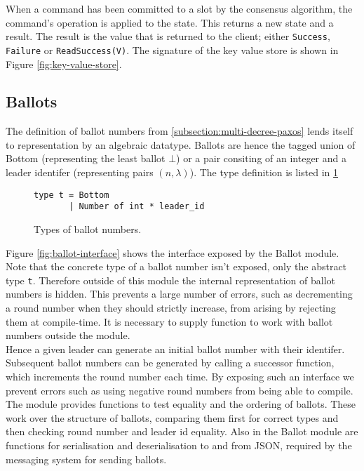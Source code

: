 When a command has been committed to a slot by the consensus algorithm, the command's operation is applied to the state. This returns a new state and a result. The result is the value that is returned to the client; either \texttt{Success}, \texttt{Failure} or \texttt{ReadSuccess(V)}. The signature of the key value store is shown in Figure \ref{fig:key-value-store}.

\subsection{Ballots}

The definition of ballot numbers from \ref{subsection:multi-decree-paxos} lends itself to representation by an algebraic datatype. Ballots are hence the tagged union of Bottom (representing the least ballot $\bot$) or a pair consiting of an integer and a leader identifer (representing pairs $\left(n,\lambda\right)$). The type definition is listed in \ref{fig:ballot-types} \\

\begin{figure}
  \begin{lstlisting}
type t = Bottom
       | Number of int * leader_id
  \end{lstlisting}
    \caption{Types of ballot numbers.}
    \label{fig:ballot-types}
  \centering
\end{figure}

Figure \ref{fig:ballot-interface} shows the interface exposed by the Ballot module. Note that the concrete type of a ballot number isn't exposed, only the abstract type \texttt{t}. Therefore outside of this module the internal representation of ballot numbers is hidden. This prevents a large number of errors, such as decrementing a round number when they should strictly increase, from arising by rejecting them at compile-time. It is necessary to supply function to work with ballot numbers outside the module. \\

Hence a given leader can generate an initial ballot number with their identifer. Subsequent ballot numbers can be generated by calling a successor function, which increments the round number each time. By exposing such an interface we prevent errors such as using negative round numbers from being able to compile. \\

The module provides functions to test equality and the ordering of ballots. These work over the structure of ballots, comparing them first for correct types and then checking round number and leader id equality. Also in the Ballot module are functions for serialisation and deserialisation to and from JSON, required by the messaging system for sending ballots.

